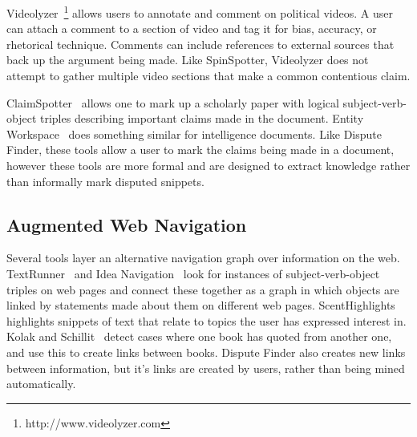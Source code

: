 \documentclass{www2010-submission}
\newcommand{\todo}[1]{}
\begin{document}
Videolyzer~\cite{Diakopoulos2008}\footnote{http://www.videolyzer.com} allows users to annotate and comment on political videos. A user can attach a comment to a section of video and tag it for bias, accuracy, or rhetorical technique. Comments can include references to external sources that back up the argument being made. Like SpinSpotter, Videolyzer does not attempt to gather multiple video sections that make a common contentious claim.

ClaimSpotter~\cite{Sereno2005,Sereno2004} allows one to mark up a scholarly paper with logical subject-verb-object triples describing important claims made in the document. Entity Workspace~\cite{Bier2006} does something similar for intelligence documents. Like Dispute Finder, these tools allow a user to mark the claims being made in a document, however these tools are more formal and are designed to extract knowledge rather than informally mark disputed snippets.

\todo{Ask Nicholas if he would like to read the paper}

\subsection{Augmented Web Navigation}

Several tools layer an alternative navigation graph over information on the web. TextRunner~\cite{Etzioni2008} and Idea Navigation~\cite{Etzioni2008} look for instances of subject-verb-object triples on web pages and connect these together as a graph in which objects are linked by statements made about them on different web pages. ScentHighlights~\cite{Chi2005a} highlights snippets of text that relate to topics the user has expressed interest in. Kolak and Schillit~\cite{Kolak2008} detect cases where one book has quoted from another one, and use this to create links between books. Dispute Finder also creates new links between information, but it's links are created by users, rather than being mined automatically.


% 

% 
\end{document}

